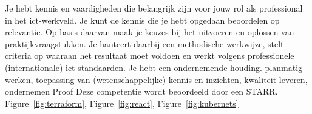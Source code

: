\competentie
{%
	\competentieformulier
	{%
		Je hebt kennis en vaardigheden die belangrijk zijn voor
		jouw rol als professional in het ict-werkveld. Je kunt de
		kennis die je hebt opgedaan beoordelen op relevantie.
		Op basis daarvan maak je keuzes bij het uitvoeren en
		oplossen van praktijkvraagstukken. Je hanteert daarbij
		een methodische werkwijze, stelt criteria op waaraan
		het resultaat moet voldoen en werkt volgens
		professionele (internationale) ict-standaarden.
		Je hebt een ondernemende houding.
	}
	{%
		planmatig werken,
		toepassing van (wetenschappelijke) kennis en inzichten,
		kwaliteit leveren,
		ondernemen
	}
	{%
		Proof
	}
	{%
		Deze competentie wordt beoordeeld door een STARR.
	}
	{%
		Figure~\ref{fig:terraform},
		Figure~\ref{fig:react},
		Figure~\ref{fig:kubernets}
	}
}
